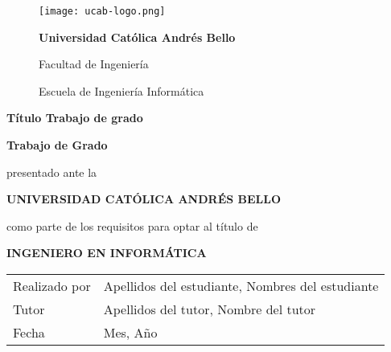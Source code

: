 \newcommand{\touppercase}[1]{\MakeUppercase{#1}}

\newcommand{\universidad}{Universidad Católica Andrés Bello}
\newcommand{\titulo}{Título Trabajo de grado \\}
\newcommand{\estudiante}{Apellidos del estudiante, Nombres del estudiante }
\newcommand{\tutor}{Apellidos del tutor, Nombre del tutor}
\newcommand{\fecha}{Mes, Año}

\newcommand{\membrete}{
  \normalsize\selectfont\bfseries
  \universidad \par
  Facultad de Ingeniería \par
  Escuela de Ingeniería Informática \par
}

\newcommand{\prelude}{
  \textbf{Trabajo de Grado} \par
  presentado ante la \par
  \touppercase{\textbf{\universidad}} \par
  como parte de los requisitos para optar al título de \par
  \touppercase{\textbf{Ingeniero en Informática}} \par
}

\newcommand{\details}{
  \begin{tabularx}{\textwidth}{X >{\hsize=1.35\hsize}X}
    Realizado por & \estudiante \\
    Tutor         & \tutor      \\
    Fecha         & \fecha      \\
  \end{tabularx}
}

\begin{center}
  \begin{figure}[h]
    \centering
    \texttt{[image: ucab-logo.png]} \\
    \centering
    \renewcommand{\baselinestretch}{1.5}
    \membrete
  \end{figure}
  \vspace*{\fill}
  \textbf{\titulo}
  \vspace*{\fill}
  \prelude
  \vspace*{\fill}
  \details
\end{center}

\clearpage
